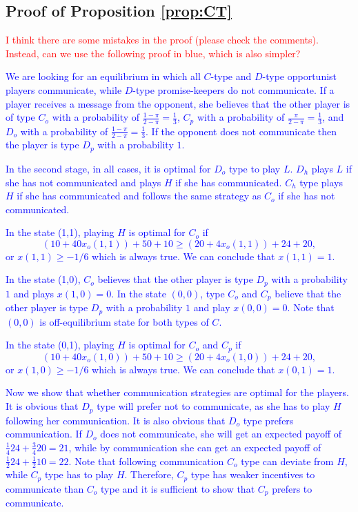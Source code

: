 \documentclass[12pt]{article}
\theoremstyle{break}
\begin{document}
\subsection*{Proof of Proposition \ref{prop:CT}}
\textcolor{red}{I think there are some mistakes in the proof (please check the comments). Instead, can we use the following proof in blue, which is also simpler?}

\textcolor{blue}{We are looking for an equilibrium in which all $C$-type and $D$-type opportunist players communicate, while $D$-type promise-keepers do not communicate. If a player receives a message from the opponent, she believes that the other player is of type $C_o$ with a probability of $\frac{1-\pi}{2-\pi}=\frac{1}{3}$, $C_p$ with a probability of $\frac{\pi}{2-\pi}=\frac{1}{3}$, and $D_o$ with a probability of $\frac{1-\pi}{2-\pi}=\frac{1}{3}$. If the opponent does not communicate then the player is type $D_p$ with a probability $1$.}

\textcolor{blue}{In the second stage, in all cases, it is optimal for $D_o$ type to play $L$. $D_h$ plays $L$ if she has not communicated and plays $H$ if she has communicated. $C_h$ type plays $H$ if she has communicated and follows the same strategy as $C_o$ if she has not communicated.}

\textcolor{blue}{In the state (1,1), playing $H$ is optimal for $C_o$ if $$ (10+40x_o(1,1))+50+10\geq (20+4x_o(1,1))+24+20,$$ or $x(1,1)\geq-1/6$ which is always true. We can conclude that $x(1,1)=1$.}

\textcolor{blue}{In the state (1,0), $C_o$ believes that the other player is type $D_p$ with a probability $1$ and plays $x(1,0)=0$. In the state $(0,0)$, type $C_o$ and $C_p$ believe that the other player is type $D_p$ with a probability $1$ and play $x(0,0)=0$. Note that $(0,0)$ is off-equilibrium state for both types of $C$.}

\textcolor{blue}{In the state (0,1), playing $H$ is optimal for $C_o$ and $C_p$ if $$ (10+40x_o(1,0))+50+10\geq (20+4x_o(1,0))+24+20,$$ or $x(1,0)\geq-1/6$ which is always true. We can conclude that $x(0,1)=1$.}

\textcolor{blue}{Now we show that whether communication strategies are optimal for the players. It is obvious that $D_p$ type will prefer not to communicate, as she has to play $H$ following her communication. It is also obvious that $D_o$ type prefers communication. If $D_o$ does not communicate, she will get an expected payoff of $\frac{1}{4}24+\frac{3}{4}20=21$, while by communication she can get an expected payoff of $\frac{1}{2}24+\frac{1}{2}10=22$. Note that following communication $C_o$ type can deviate from $H$, while $C_p$ type has to play $H$. Therefore, $C_p$ type has weaker incentives to communicate than $C_o$ type and it is sufficient to show that $C_p$ prefers to communicate.}
\end{document}
